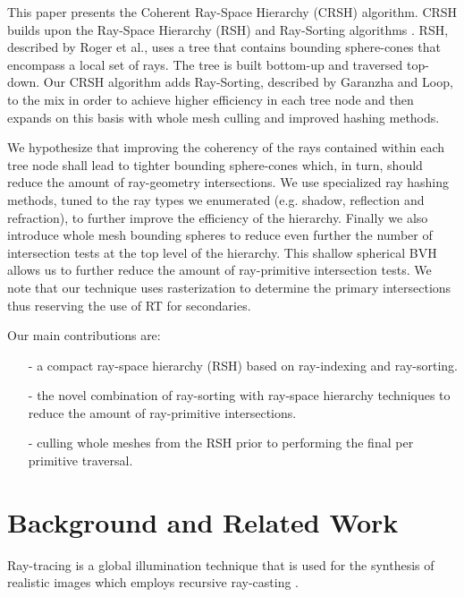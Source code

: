 \documentclass{egpubl}
\begin{document}
This paper presents the Coherent Ray-Space Hierarchy (CRSH) algorithm. CRSH builds upon the Ray-Space Hierarchy (RSH) \cite{Roger07} and Ray-Sorting algorithms \cite{Garanzha10}. RSH, described by Roger et al., uses a tree that contains bounding sphere-cones that encompass a local set of rays. The tree is built bottom-up and traversed top-down. Our CRSH algorithm adds Ray-Sorting, described by Garanzha and Loop, to the mix in order to achieve higher efficiency in each tree node and then expands on this basis with whole mesh culling and improved hashing methods.

We hypothesize that improving the coherency of the rays contained within each tree node shall lead to tighter bounding sphere-cones which, in turn, should reduce the amount of ray-geometry intersections. We use specialized ray hashing methods, tuned to the ray types we enumerated (e.g. shadow, reflection and refraction), to further improve the efficiency of the hierarchy. Finally we also introduce whole mesh bounding spheres to reduce even further the number of intersection tests at the top level of the hierarchy. This shallow spherical BVH allows us to further reduce the amount of ray-primitive intersection tests. We note that our technique uses rasterization to determine the primary intersections thus reserving the use of RT for secondaries.

Our main contributions are:
\begin{itemize}
    \item[-] a compact ray-space hierarchy (RSH) based on ray-indexing and ray-sorting.
    \item[-] the novel combination of ray-sorting \cite{Garanzha10} with ray-space hierarchy techniques \cite{Roger07} to reduce the amount of ray-primitive intersections.
    \item[-] culling whole meshes from the RSH prior to performing the final per primitive traversal.
\end{itemize}

\section{Background and Related Work}

Ray-tracing \cite{Whitted80} is a global illumination \cite{Ritschel12} technique that is used for the synthesis of realistic images which employs recursive ray-casting \cite{Appel68}.
\end{document}
